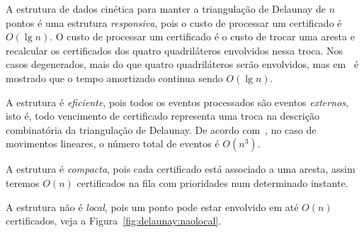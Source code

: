 A estrutura de dados cinética para manter a triangulação de Delaunay de $n$ pontos é uma estrutura
\textit{responsiva}, pois o custo de processar um certificado é $O(\lg{n})$.
O custo de processar um certificado é o custo de trocar uma aresta e recalcular os certificados dos
quatro quadriláteros envolvidos nessa troca.
Nos casos degenerados, mais do que quatro quadriláteros serão envolvidos, mas
em~\cite{guibas-mitchell-roos} é mostrado que o tempo amortizado continua sendo $O(\lg{n})$.

A estrutura é \textit{eficiente}, pois todos os eventos processados são eventos \textit{externos},
isto é, todo vencimento de certificado representa uma troca na descrição combinatória da
triangulação de Delaunay.
De acordo com~\cite{eduardo}, no caso de movimentos lineares, o número total de eventos é
$O(n^3)$.

A estrutura é \textit{compacta}, pois cada certificado está associado a uma aresta, assim teremos
$O(n)$ certificados na fila com prioridades num determinado instante.

A estrutura não é \textit{local}, pois um ponto pode estar envolvido em até $O(n)$
certificados, veja a Figura~\ref{fig:delaunay:naolocal}.


